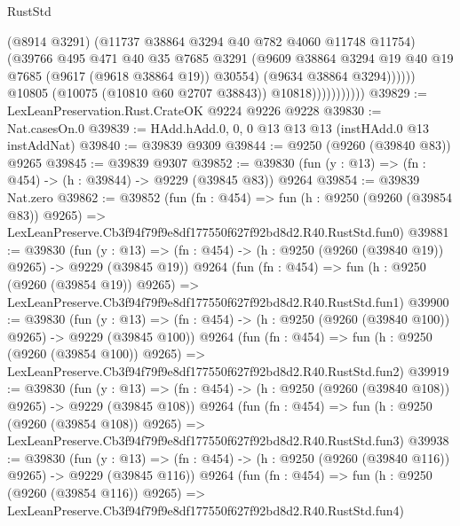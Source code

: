 \begin{lexlean}{RustStd}
\begin{coremodule}
                                  (@8914 @3291)
                                  (@11737 @38864 @3294 @40 @782 @4060 @11748 @11754)
                                  (@39766
                                    @495
                                    @471
                                    @40
                                    @35
                                    @7685
                                    @3291
                                    (@9609
                                      @38864
                                      @3294
                                      @19
                                      @40
                                      @19
                                      @7685
                                      (@9617 (@9618 @38864 @19))
                                      @30554)
                                    (@9634 @38864 @3294))))))
                          @10805
                          (@10075 (@10810 @60 @2707 @38843))
                          @10818)))))))))))
@39829 := LexLeanPreservation.Rust.CrateOK @9224 @9226 @9228
@39830 := Nat.casesOn.{0}
@39839 := HAdd.hAdd.{0, 0, 0} @13 @13 @13 (instHAdd.{0} @13 instAddNat)
@39840 := @39839 @9309
@39844 := @9250 (@9260 (@39840 @83)) @9265
@39845 := @39839 @9307
@39852 := @39830 (fun (y : @13) => (fn : @454) -> (h : @39844) -> @9229 (@39845 @83)) @9264
@39854 := @39839 Nat.zero
@39862 := @39852
    (fun (fn : @454) =>
    fun (h : @9250 (@9260 (@39854 @83)) @9265) =>
    LexLeanPreserve.Cb3f94f79f9e8df177550f627f92bd8d2.R40.RustStd.fun0)
@39881 := @39830
    (fun (y : @13) => (fn : @454) -> (h : @9250 (@9260 (@39840 @19)) @9265) -> @9229 (@39845 @19))
    @9264
    (fun (fn : @454) =>
    fun (h : @9250 (@9260 (@39854 @19)) @9265) =>
    LexLeanPreserve.Cb3f94f79f9e8df177550f627f92bd8d2.R40.RustStd.fun1)
@39900 := @39830
    (fun (y : @13) => (fn : @454) -> (h : @9250 (@9260 (@39840 @100)) @9265) -> @9229 (@39845 @100))
    @9264
    (fun (fn : @454) =>
    fun (h : @9250 (@9260 (@39854 @100)) @9265) =>
    LexLeanPreserve.Cb3f94f79f9e8df177550f627f92bd8d2.R40.RustStd.fun2)
@39919 := @39830
    (fun (y : @13) => (fn : @454) -> (h : @9250 (@9260 (@39840 @108)) @9265) -> @9229 (@39845 @108))
    @9264
    (fun (fn : @454) =>
    fun (h : @9250 (@9260 (@39854 @108)) @9265) =>
    LexLeanPreserve.Cb3f94f79f9e8df177550f627f92bd8d2.R40.RustStd.fun3)
@39938 := @39830
    (fun (y : @13) => (fn : @454) -> (h : @9250 (@9260 (@39840 @116)) @9265) -> @9229 (@39845 @116))
    @9264
    (fun (fn : @454) =>
    fun (h : @9250 (@9260 (@39854 @116)) @9265) =>
    LexLeanPreserve.Cb3f94f79f9e8df177550f627f92bd8d2.R40.RustStd.fun4)

\end{coremodule}
\end{lexlean}
